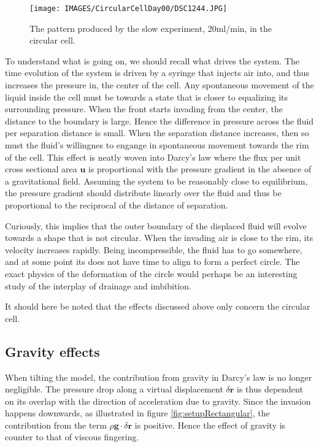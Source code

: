 \documentclass[twoside,utf8]{article}
\begin{document}
\begin{figure}[H]
	\begin{center}
	\texttt{[image: IMAGES/CircularCellDay00/DSC1244.JPG]}
	\end{center}
	\caption{The pattern produced by the slow experiment, 20ml/min, in the circular cell.}
	\label{fig:patternChange}
\end{figure}

\noindent
To understand what is going on, we should recall what drives the system. The time evolution of the system is driven by a syringe that injects air into, and thus increases the pressure in, the center of the cell. Any spontaneous movement of the liquid inside the cell must be towards a state that is closer to equalizing its surrounding pressure. When the front starts invading from the center, the distance to the boundary is large. Hence the difference in pressure across the fluid per separation distance is small. When the separation distance increases, then so must the fluid's willingnes to engange in spontaneous movement towards the rim of the cell. This effect is neatly woven into Darcy's law where the flux per unit cross sectional area $\mathbf{u}$ is proportional with the pressure gradient in the absence of a gravitational field. Assuming the system to be reasonably close to equilibrium, the pressure gradient should distribute linearly over the fluid and thus be proportional to the reciprocal of the distance of separation.

Curiously, this implies that the outer boundary of the displaced fluid will evolve towards a shape that is not circular. When the invading air is close to the rim, its velocity increases rapidly. Being incompressible, the fluid has to go somewhere, and at some point its does not have time to align to form a perfect circle. The exact physics of the deformation of the circle would perhaps be an interesting study of the interplay of drainage and imbibition.

It should here be noted that the effects discussed above only concern the circular cell.





\subsection{Gravity effects}
When tilting the model, the contribution from gravity in Darcy's law is no longer negligible. The pressure drop along a virtual displacement $\delta \mathbf{r}$ is thus dependent on its overlap with the direction of acceleration due to gravity. Since the invasion happens downwards, as illustrated in figure \ref{fig:setupRectangular}, the contribution from the term $\rho \mathbf{g} \cdot \delta \mathbf{r}$ is positive. Hence the effect of gravity is counter to that of viscous fingering.
\end{document}
